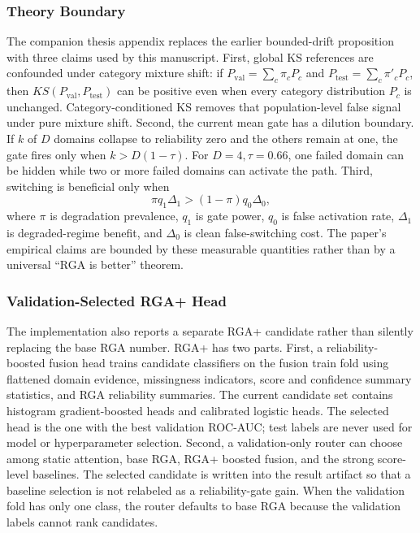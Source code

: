\documentclass[10pt,conference]{IEEEtran}
\newcommand{\method}{RGA}
\newcommand{\methodplus}{RGA+}
\begin{document}
\subsubsection{Theory Boundary}
The companion thesis appendix replaces the earlier bounded-drift proposition
with three claims used by this manuscript. First, global KS references are
confounded under category mixture shift: if
$P_{\mathrm{val}}=\sum_c\pi_cP_c$ and
$P_{\mathrm{test}}=\sum_c\pi'_cP_c$, then $KS(P_{\mathrm{val}},
P_{\mathrm{test}})$ can be positive even when every category distribution
$P_c$ is unchanged. Category-conditioned KS removes that population-level
false signal under pure mixture shift. Second, the current mean gate has a
dilution boundary. If $k$ of $D$ domains collapse to reliability zero and the
others remain at one, the gate fires only when $k>D(1-\tau)$. For
$D=4,\tau=0.66$, one failed domain can be hidden while two or more failed
domains can activate the path. Third, switching is beneficial only when
\[
  \pi q_1\Delta_1 > (1-\pi)q_0\Delta_0,
\]
where $\pi$ is degradation prevalence, $q_1$ is gate power, $q_0$ is false
activation rate, $\Delta_1$ is degraded-regime benefit, and $\Delta_0$ is clean
false-switching cost. The paper's empirical claims are bounded by these
measurable quantities rather than by a universal ``RGA is better'' theorem.

\subsubsection{Validation-Selected \methodplus{} Head}
The implementation also reports a separate \methodplus{} candidate rather than
silently replacing the base \method{} number. \methodplus{} has two parts. First,
a reliability-boosted fusion head trains candidate classifiers on the fusion
train fold using flattened domain evidence, missingness indicators, score and
confidence summary statistics, and \method{} reliability summaries. The current
candidate set contains histogram gradient-boosted heads and calibrated logistic
heads. The selected head is the one with the best validation ROC-AUC; test
labels are never used for model or hyperparameter selection. Second, a
validation-only router can choose among static attention, base \method{},
\methodplus{} boosted fusion, and the strong score-level baselines. The selected
candidate is written into the result artifact so that a baseline selection is
not relabeled as a reliability-gate gain. When the validation fold has only one
class, the router defaults to base \method{} because the validation labels cannot
rank candidates.
\end{document}

